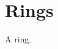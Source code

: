 \documentclass{article}
\begin{document}
\section{Rings}
A \gls{ring}. \ownglossaries
\printnoidxglossaries
\end{document}
